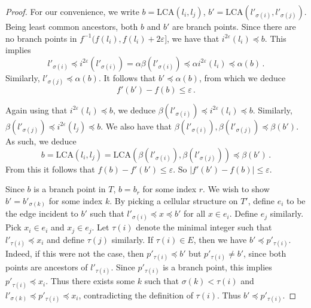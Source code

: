 \documentclass{article}
\theoremstyle{definition}
\newcommand{\LCA}{\mathrm{LCA}}
\renewcommand{\epsilon}{\varepsilon}
\begin{document}
\begin{proof}
    For our convenience, we write $b = \LCA(l_i,l_j)$, $b' = \LCA(l'_{\sigma(i)}, l'_{\sigma(j)})$. Being least common ancestors, both $b$ and $b'$ are branch points. Since there are no branch points in $f^{-1}(f(l_i), f(l_i) + 2\epsilon]$, we have that $i^{2\epsilon}(l_i) \preceq b$. This implies
    \begin{equation*}
        l'_{\sigma(i)} \preceq i^{2\epsilon}(l'_{\sigma(i)}) = \alpha\beta(l'_{\sigma(i)}) \preceq \alpha i^{2\epsilon}(l_i) \preceq \alpha(b)\,.
    \end{equation*}
    Similarly, $l'_{\sigma(j)} \preceq \alpha(b)$. It follows that $b' \preceq \alpha(b)$, from which we deduce
    \begin{equation*}
        f'(b') - f(b) \leq \epsilon\,.
    \end{equation*}

    Again using that $i^{2\epsilon}(l_i) \preceq b$, we deduce $\beta(l'_{\sigma(i)}) \preceq i^{2\epsilon}(l_i) \preceq b$. Similarly, $\beta(l'_{\sigma(j)})\preceq i^{2\epsilon}(l_j) \preceq b$. We also have that $\beta(l'_{\sigma(i)}),\beta(l'_{\sigma(j)}) \preceq \beta(b')$. As such, we deduce
    \begin{equation*}
        b = \LCA(l_i,l_j) = \LCA(\beta(l'_{\sigma(i)}), \beta(l'_{\sigma(j)})) \preceq \beta(b')\,.
    \end{equation*}
    From this it follows that $f(b) - f'(b') \leq \epsilon$. So $|f'(b') - f(b)| \leq \epsilon$.

    Since $b$ is a branch point in $T$, $b = b_r$ for some index $r$. We wish to show $b' = b'_{\sigma(k)}$ for some index $k$. By picking a cellular structure on $T'$, define $e_i$ to be the edge incident to $b'$ such that $l'_{\sigma(i)} \preceq x \preceq b'$ for all $x \in e_i$. Define $e_j$ similarly. Pick $x_i \in e_i$ and $x_j \in e_j$. Let $\tau(i)$ denote the minimal integer such that $l'_{\tau(i)} \preceq x_i$ and define $\tau(j)$ similarly. If $\tau(i) \in E$, then we have $b' \preceq p'_{\tau(i)}$. Indeed, if this were not the case, then $p'_{\tau(i)} \preceq b'$ but $p'_{\tau(i)} \neq b'$, since both points are ancestors of $l'_{\tau(i)}$. Since $p'_{\tau(i)}$ is a branch point, this implies $p'_{\tau(i)} \preceq x_i$. Thus there exists some $k$ such that $\sigma(k) < \tau(i)$ and $l'_{\sigma(k)} \preceq p'_{\tau(i)} \preceq x_i$, contradicting the definition of $\tau(i)$. Thus $b' \preceq p'_{\tau(i)}$.


\end{proof}
\end{document}
